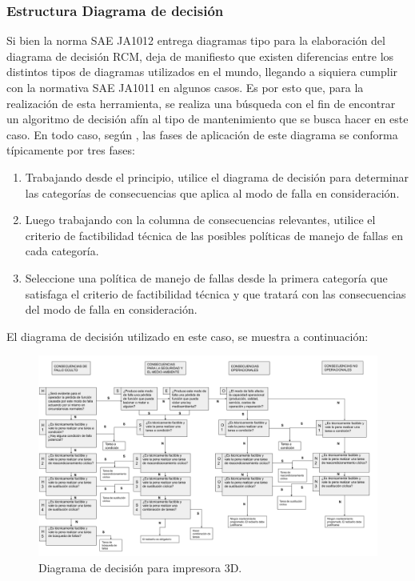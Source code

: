 \subsubsection{Estructura Diagrama de decisión}

Si bien la norma SAE JA1012 entrega diagramas tipo para la elaboración del diagrama de decisión RCM, deja de manifiesto que existen diferencias entre los distintos tipos de diagramas utilizados en el mundo, llegando a siquiera cumplir con la normativa SAE JA1011 en algunos casos. Es por esto que, para la realización de esta herramienta, se realiza una búsqueda con el fin de encontrar un algoritmo de decisión afín al tipo de mantenimiento que se busca hacer en este caso. En todo caso, según \cite{saeja1012}, las fases de aplicación de este diagrama se conforma típicamente por tres fases:

\begin{enumerate}
\item Trabajando desde el principio, utilice el diagrama de decisión para determinar las categorías de consecuencias que aplica al modo de falla en consideración.
\item Luego trabajando con la columna de consecuencias relevantes, utilice el criterio de factibilidad técnica de las posibles políticas de manejo de fallas en cada categoría.
\item Seleccione una política de manejo de fallas desde la primera categoría que satisfaga el criterio de factibilidad técnica y que tratará con las consecuencias del modo de falla en consideración.

\end{enumerate}

El diagrama de decisión utilizado en este caso, se muestra a continuación:

\begin{figure}[H]
\centering
\includegraphics[scale=0.45, angle=90]{images/decisionrcm.png}
\caption{Diagrama de decisión para impresora 3D.}
\end{figure}



